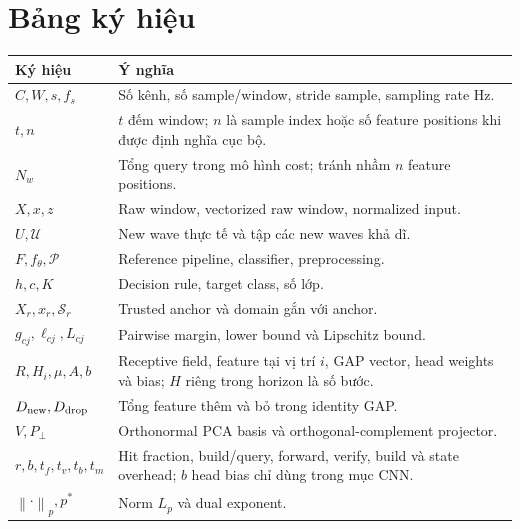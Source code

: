 \documentclass[11pt,a4paper]{article}
\newcommand{\norm}[1]{\left\lVert #1\right\rVert}
\newcommand{\Sset}{\mathcal S}
\newcommand{\Uset}{\mathcal U}
\theoremstyle{remark}
\begin{document}
\section{Bảng ký hiệu}
\begin{longtable}{@{}p{3.0cm}p{10.4cm}@{}}
\toprule Ký hiệu & Ý nghĩa\\\midrule\endhead
$C,W,s,f_s$ & Số kênh, số sample/window, stride sample, sampling rate Hz.\\
$t,n$ & $t$ đếm window; $n$ là sample index hoặc số feature positions khi
được định nghĩa cục bộ.\\
$N_w$ & Tổng query trong mô hình cost; tránh nhầm $n$ feature positions.\\
$X,x,z$ & Raw window, vectorized raw window, normalized input.\\
$U,\Uset$ & New wave thực tế và tập các new waves khả dĩ.\\
$F,f_\theta,\mathcal P$ & Reference pipeline, classifier, preprocessing.\\
$h,c,K$ & Decision rule, target class, số lớp.\\
$X_r,x_r,\Sset_r$ & Trusted anchor và domain gắn với anchor.\\
$g_{cj},\ell_{cj},L_{cj}$ & Pairwise margin, lower bound và Lipschitz bound.\\
$R,H_i,\mu,A,b$ & Receptive field, feature tại vị trí $i$, GAP vector,
head weights và bias; $H$ riêng trong horizon là số bước.\\
$D_{\rm new},D_{\rm drop}$ & Tổng feature thêm và bỏ trong identity GAP.\\
$V,P_\perp$ & Orthonormal PCA basis và orthogonal-complement projector.\\
$r,b,t_f,t_v,t_b,t_m$ & Hit fraction, build/query, forward, verify, build và
state overhead; $b$ head bias chỉ dùng trong mục CNN.\\
$\norm{\cdot}_p,p^*$ & Norm $L_p$ và dual exponent.\\\bottomrule
\end{longtable}
\end{document}
